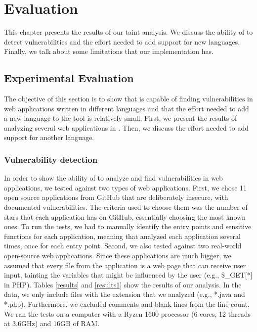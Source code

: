 
\chapter{Evaluation}
\label{chapter:results}

This chapter presents the results of our taint analysis. We discuss the ability of \toolname{} to detect vulnerabilities and the effort needed to add support for new languages. Finally, we talk about some limitations that our implementation has.

\section{Experimental Evaluation}
\label{evaluation}
The objective of this section is to show that \toolname{} is capable of finding vulnerabilities in web applications written in different languages and that the effort needed to add a new language to the tool is relatively small. First, we present the results of analyzing several web applications in \implangs{}. Then, we discuss the effort needed to add support for another language.


\subsection{Vulnerability detection}
In order to show the ability of \toolname{} to analyze and find vulnerabilities in web applications, we tested \toolname{} against two types of web applications. First, we chose 11 open source applications from GitHub that are deliberately insecure, with documented vulnerabilities. The criteria used to choose them was the number of stars that each application has on GitHub, essentially choosing the most known ones. To run the tests, we had to manually identify the entry points and sensitive functions for each application, meaning that \toolname{} analyzed each application several times, once for each entry point. Second, we also tested \toolname{} against two real-world open-source web applications. Since these applications are much bigger, we assumed that every file from the application is a web page that can receive user input, tainting the variables that might be influenced by the user (e.g., \$\_GET[*] in PHP). Tables \ref{results} and \ref{results1} show the results of our analysis. In the data, we only include files with the extension that we analyzed (e.g., *.java and *.php). Furthermore, we excluded comments and blank lines from the line count. We ran the tests on a computer with a Ryzen 1600 processor (6 cores, 12 threads at 3.6GHz) and 16GB of RAM. 

